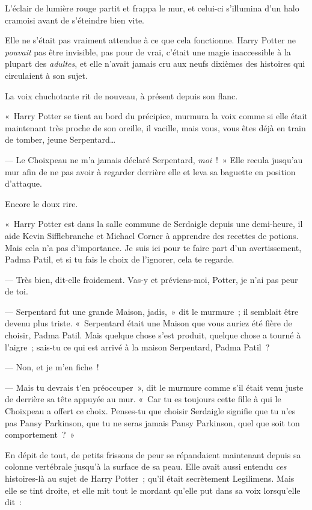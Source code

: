 L'éclair de lumière rouge partit et frappa le mur, et celui-ci s'illumina d'un halo cramoisi avant de s'éteindre bien vite.

Elle ne s'était pas vraiment attendue à ce que cela fonctionne.
Harry Potter ne \emph{pouvait} pas être invisible, pas pour de vrai, c'était une magie inaccessible à la plupart des \emph{adultes}, et elle n'avait jamais cru aux neufs dixièmes des histoires qui circulaient à son sujet.

La voix chuchotante rit de nouveau, à présent depuis son flanc.

«~Harry Potter se tient au bord du précipice, murmura la voix comme si elle était maintenant très proche de son oreille, il vacille, mais vous, vous êtes déjà en train de tomber, jeune Serpentard…

--- Le Choixpeau ne m'a jamais déclaré Serpentard, \emph{moi}~!~»
Elle recula jusqu'au mur afin de ne pas avoir à regarder derrière elle et leva sa baguette en position d'attaque.

Encore le doux rire.

«~Harry Potter est dans la salle commune de Serdaigle depuis une demi-heure, il aide Kevin Sifflebranche et Michael Corner à apprendre des recettes de potions.
Mais cela n'a pas d'importance.
Je suis ici pour te faire part d'un avertissement, Padma Patil, et si tu fais le choix de l'ignorer, cela te regarde.

--- Très bien, dit-elle froidement.
Vas-y et préviens-moi, Potter, je n'ai pas peur de toi.

--- Serpentard fut une grande Maison, jadis,~» dit le murmure~; il semblait être devenu plus triste.
«~Serpentard était une Maison que vous auriez été fière de choisir, Padma Patil.
Mais quelque chose s'est produit, quelque chose a tourné à l'aigre~; sais-tu ce qui est arrivé à la maison Serpentard, Padma Patil~?

--- Non, et je m'en fiche~!

--- Mais tu devrais t'en préoccuper~», dit le murmure comme s'il était venu juste de derrière sa tête appuyée au mur.
«~Car tu es toujours cette fille à qui le Choixpeau a offert ce choix.
Penses-tu que choisir Serdaigle signifie que tu n'es pas Pansy Parkinson, que tu ne seras jamais Pansy Parkinson, quel que soit ton comportement~?~»

En dépit de tout, de petits frissons de peur se répandaient maintenant depuis sa colonne vertébrale jusqu'à la surface de sa peau.
Elle avait aussi entendu \emph{ces} histoires-là au sujet de Harry Potter~; qu'il était secrètement Legilimens.
Mais elle se tint droite, et elle mit tout le mordant qu'elle put dans sa voix lorsqu'elle dit~:

